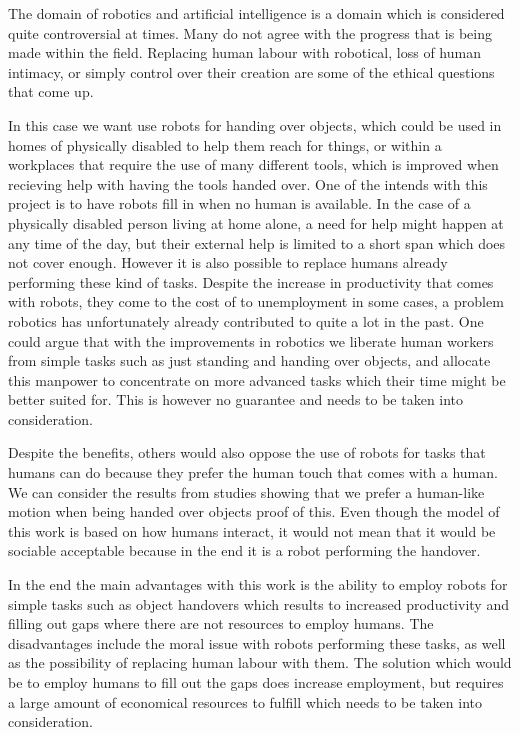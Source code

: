 The domain of robotics and artificial intelligence is a domain which is considered quite controversial at times. Many do not agree with the progress that is being made within the field. Replacing human labour with robotical, loss of human intimacy, or simply control over their creation are some of the ethical questions that come up.

In this case we want use robots for handing over objects, which could be used in homes of physically disabled to help them reach for things, or within a workplaces that require the use of many different tools, which is improved when recieving help with having the tools handed over. One of the intends with this project is to have robots fill in when no human is available. In the case of a physically disabled person living at home alone, a need for help might happen at any time of the day, but their external help is limited to a short span which does not cover enough. However it is also possible to replace humans already performing these kind of tasks. Despite the increase in productivity that comes with robots, they come to the cost of to unemployment in some cases, a problem robotics has unfortunately already contributed to quite a lot in the past. One could argue that with the improvements in robotics we liberate human workers from simple tasks such as just standing and handing over objects, and allocate this manpower to concentrate on more advanced tasks which their time might be better suited for. This is however no guarantee and needs to be taken into consideration.

Despite the benefits, others would also oppose the use of robots for tasks that humans can do because they prefer the human touch that comes with a human. We can consider the results from studies showing that we prefer a human-like motion when being handed over objects proof of this. Even though the model of this work is based on how humans interact, it would not mean that it would be sociable acceptable because in the end it is a robot performing the handover.

In the end the main advantages with this work is the ability to employ robots for simple tasks such as object handovers which results to increased productivity and filling out gaps where there are not resources to employ humans. The disadvantages include the moral issue with robots performing these tasks, as well as the possibility of replacing human labour with them. The solution which would be to employ humans to fill out the gaps does increase employment, but requires a large amount of economical resources to fulfill which needs to be taken into consideration.



